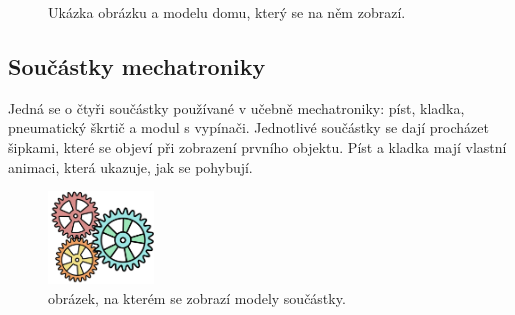 \documentclass[12pt, a4paper,
twoside,        %
openright
]{report}
\begin{document}
\begin{figure}[H]
	\centering
	\qquad
	\caption{Ukázka obrázku a modelu domu, který se na něm zobrazí.}
	\label{fig:house}
\end{figure}

\newpage

\subsection{Součástky mechatroniky}	
Jedná se o čtyři součástky používané v učebně mechatroniky: píst, kladka, pneumatický škrtič a modul s vypínači.
Jednotlivé součástky se dají procházet šipkami, které se objeví při zobrazení prvního objektu. Píst a kladka mají vlastní animaci, která ukazuje, jak se pohybují. 


\begin{figure}[H]
	\centering 
	\includegraphics[width=0.25\textwidth]{image/mechatronika.png} 
	\caption{obrázek, na kterém se zobrazí modely součástky.} 
	\label{fig:mechatronika_obrazek} 
\end{figure}
\end{document}

